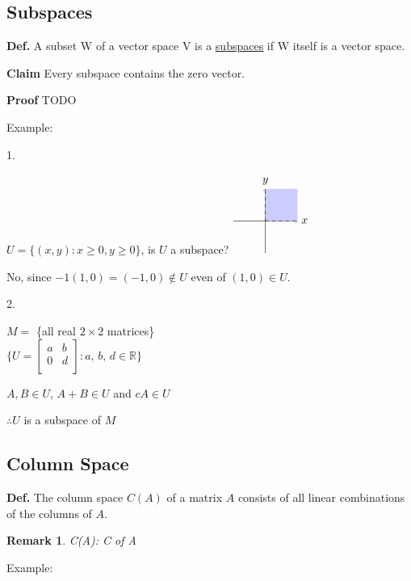 \documentclass[12pt,a4paper]{article}
\newtheorem*{rem}{Remark}
\newcommand{\Remark}[1]{
  \begin{rem}
    \color{cyan}
    #1
  \end{rem}
}
\begin{document}
\subsection*{Subspaces}

\textbf{Def.} A subset W of a vector space V is a \underline{subspaces} if W itself is a vector space.

\textbf{Claim} Every subspace contains the zero vector.

\textbf{Proof} TODO

Example:

1. 

$U = \{(x, y): x \geq 0, y \geq 0\}$, is $U$ a subspace?
$
\begin{tikzpicture}
  \draw[->] (-1, 0) -- (1, 0) node[right] {$x$};
  \draw[->] (0, -1) -- (0, 1) node[above] {$y$};

  \fill[color=blue!20] (0,0) rectangle (1,1);
    
  \draw[dashed] (0,0) -- (1,0);
  \draw[dashed] (0,0) -- (0,1);
\end{tikzpicture}
$

No, since $-1(1, 0) = (-1, 0) \notin U$ even of $(1, 0) \in U$.

2.

$M =$ \{all real $2 \times 2$ matrices\} \\
$
\{
  U = 
  \begin{bmatrix}
    a & b \\
    0 & d \\
  \end{bmatrix}:
  a,\,b,\,d \in \mathbb{R}
\}
$

$A, B \in U$, $A + B \in U$ and $cA \in U$

$\therefore U$ is a subspace of $M$ 

\subsection*{Column Space}

\textbf{Def.} The column space $C(A)$ of a matrix $A$ consists of all linear combinations of the columns of $A$.

\Remark{C(A): C of A}

Example:
\end{document}
